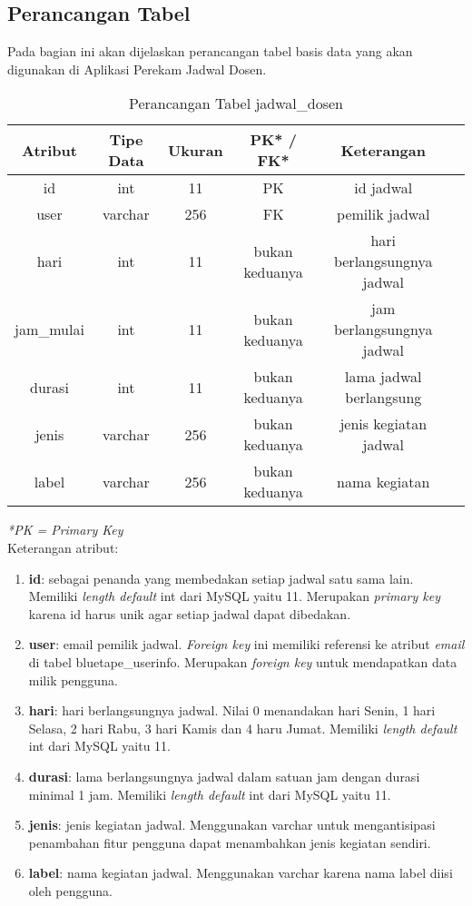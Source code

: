 \subsection{Perancangan Tabel}
Pada bagian ini akan dijelaskan perancangan tabel basis data yang akan digunakan di Aplikasi Perekam Jadwal Dosen.
\begin{center}
	\begin{table}[H]
	\caption{Perancangan Tabel jadwal\_dosen}
	\begin{tabular}{|c|c|c|c|c|c|}
 			\hline
		\textbf{Atribut} & \textbf{Tipe Data} & \textbf{Ukuran} & \textbf{PK* / FK*}  & \textbf{Keterangan} \\
			\hline
		 id & int & 11 & PK &  id jadwal\\
			 \hline
			 user & varchar & 256 & FK &   pemilik jadwal\\
			 \hline
			 hari & int & 11 & bukan keduanya &   hari berlangsungnya jadwal\\
			 \hline
			 jam\_mulai & int & 11 & bukan keduanya &  jam berlangsungnya jadwal\\
			 \hline
			 durasi & int & 11 & bukan keduanya &  lama jadwal berlangsung\\
			 \hline
			 jenis & varchar & 256 & bukan keduanya &  jenis kegiatan jadwal\\
			 \hline
			 label & varchar & 256 & bukan keduanya &   nama kegiatan\\
			 \hline
	\end{tabular}
	\end{table}
\end{center}
\textit{*PK = Primary Key} \\
Keterangan atribut:
	\begin{enumerate}
		\item \textbf{id}: sebagai penanda yang membedakan setiap jadwal satu sama lain. Memiliki \textit{length default} int dari MySQL yaitu 11. Merupakan \textit{primary key} karena id harus unik agar setiap jadwal dapat dibedakan.
		\item \textbf{user}: email pemilik jadwal. \textit{Foreign key }ini memiliki referensi ke atribut \textit{email} di tabel bluetape\_userinfo. Merupakan \textit{foreign key} untuk mendapatkan data milik pengguna.
		\item \textbf{hari}: hari berlangsungnya jadwal. Nilai 0 menandakan hari Senin, 1 hari Selasa, 2 hari Rabu, 3 hari Kamis dan 4 haru Jumat.  Memiliki \textit{length default} int dari MySQL yaitu 11.
		\item \textbf{durasi}: lama berlangsungnya jadwal dalam satuan jam dengan durasi minimal 1 jam.  Memiliki \textit{length default} int dari MySQL yaitu 11.
		\item \textbf{jenis}: jenis kegiatan jadwal. Menggunakan varchar untuk mengantisipasi penambahan fitur pengguna dapat menambahkan jenis kegiatan sendiri.
		\item \textbf{label}: nama kegiatan jadwal. Menggunakan varchar karena nama label diisi oleh pengguna.
	\end{enumerate}

